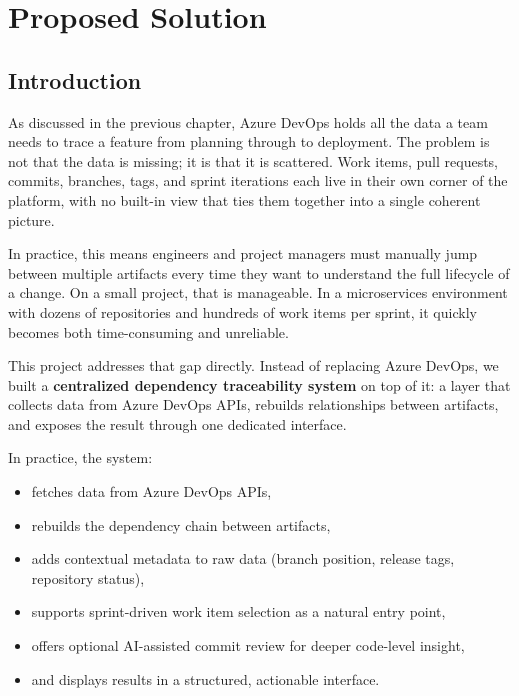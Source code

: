 \chapter{Proposed Solution}
\label{chap:proposed-solution}

\section{Introduction}
\label{sec:solution-intro}

As discussed in the previous chapter, Azure DevOps holds all the data a team needs to trace a feature from planning through to deployment. The problem is not that the data is missing; it is that it is scattered. Work items, pull requests, commits, branches, tags, and sprint iterations each live in their own corner of the platform, with no built-in view that ties them together into a single coherent picture.

In practice, this means engineers and project managers must manually jump between multiple artifacts every time they want to understand the full lifecycle of a change. On a small project, that is manageable. In a microservices environment with dozens of repositories and hundreds of work items per sprint, it quickly becomes both time-consuming and unreliable.

This project addresses that gap directly. Instead of replacing Azure DevOps, we built a \textbf{centralized dependency traceability system} on top of it: a layer that collects data from Azure DevOps APIs, rebuilds relationships between artifacts, and exposes the result through one dedicated interface.

In practice, the system:

\begin{itemize}
    \item fetches data from Azure DevOps APIs,
    \item rebuilds the dependency chain between artifacts,
    \item adds contextual metadata to raw data (branch position, release tags, repository status),
    \item supports sprint-driven work item selection as a natural entry point,
    \item offers optional AI-assisted commit review for deeper code-level insight,
    \item and displays results in a structured, actionable interface.
\end{itemize}

